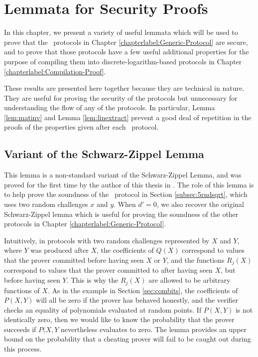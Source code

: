 \chapter{Lemmata for Security Proofs}
\label{chapterlabel:AlgIntProofs}

In this chapter, we present a variety of useful lemmata which will be used to prove that the \ILC\ protocols in Chapter \ref{chapterlabel:Generic-Protocol} are secure, and to prove that those protocols have a few useful additional properties for the purpose of compiling them into discrete-logarithm-based protocols in Chapter \ref{chapterlabel:Compilation-Proof}.

These results are presented here together because they are technical in nature. They are useful for proving the security of the protocols but unnecessary for understanding the flow of any of the protocols. In particular, Lemma \ref{lem:matinv} and Lemma \ref{lem:linextract} prevent a good deal of repetition in the proofs of the properties given after each \ILC\ protocol.

\section{Variant of the Schwarz-Zippel Lemma}

This lemma is a non-standard variant of the Schwarz-Zippel Lemma, and was proved for the first time by the author of this thesis in \cite{BootleCGGHJ17}. The role of this lemma is to help prove the soundness of the \ILC\ protocol in Section \ref{subsec:5rndsqrt}, which uses two random challenges $x$ and $y$. When $d' = 0$, we also recover the original Schwarz-Zippel lemma which is useful for proving the soundness of the other protocols in Chapter \ref{chapterlabel:Generic-Protocol}.

Intuitively, in protocols with two random challenges represented by $X$ and $Y$, where $Y$ was produced after $X$, the coefficients of $Q(X)$ correspond to values that the prover committed before having seen $X$ or $Y$, and the functions $R_j(X)$ correspond to values that the prover committed to after having seen $X$, but before having seen $Y$. This is why the $R_j(X)$ are allowed to be arbitrary functions of $X$. As in the example in Section \ref{sec:combits}, the coefficients of $P(X,Y)$ will all be zero if the prover has behaved honestly, and the verifier checks an equality of polynomials evaluated at random points. If $P(X,Y)$ is not identically zero, then we would like to know the probability that the prover succeeds if $P(X,Y$ nevertheless evaluates to zero. The lemma provides an upper bound on the probability that a cheating prover will fail to be caught out during this process.

